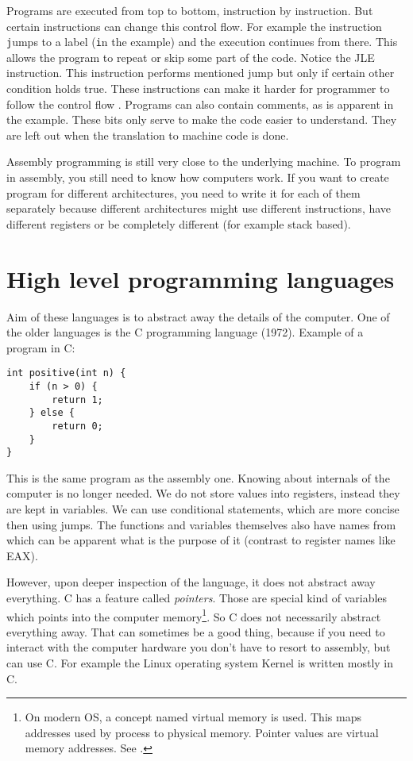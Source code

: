 Programs are executed from top to bottom, instruction by instruction. But certain instructions can change this control flow. For example the instruction \texttt
jumps to a label (\texttt in the example) and the execution continues from there. This allows the program to repeat or skip some part of the code.
Notice the JLE instruction. This instruction performs mentioned jump but only if certain other condition holds true.
These instructions can make it harder for programmer to follow the control flow .
Programs can also contain comments, as is apparent in the example. These bits only serve to make the code easier to understand.
They are left out when the translation to machine code is done.

Assembly programming is still very close to the underlying machine. To program in assembly, you still need to know
how computers work. If you want to create program for different architectures, you need to write it for each of them
separately because different architectures might use different instructions, have different registers or be completely 
different (for example stack based).

\section{High level programming languages}
Aim of these languages is to abstract away the details of the computer. One of the older languages is the C programming language (1972).
Example of a program in C:
\begin{verbatim}
int positive(int n) {
    if (n > 0) {
        return 1;
    } else {
        return 0;
    }
}
\end{verbatim}
This is the same program as the assembly one. Knowing about internals of the computer is no longer needed.
We do not store values into registers, instead they are kept in variables. We can use conditional statements,
which are more concise then using jumps. The functions and variables themselves also have names from which
can be apparent what is the purpose of it (contrast to register names like EAX).

However, upon deeper inspection of the language, it does not abstract away everything. C has a feature called
\textit{pointers}. Those are special kind of variables which points into the computer memory\footnote{On modern OS,
a concept named virtual memory is used. This maps addresses used by process to physical memory. Pointer values are virtual memory addresses. See \cite{modern-os}.}.
So C does not necessarily abstract everything away. That can sometimes be a good thing, because if you need to 
interact with the computer hardware you don't have to resort to assembly, but can use C. For example the Linux
operating system Kernel is written mostly in C.


